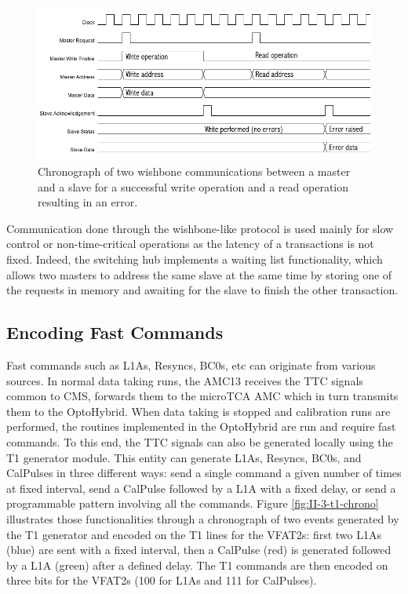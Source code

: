       \begin{figure}[h!]
        \centering
        \includegraphics[width=\textwidth]{img/II-3-test-beam/wishbone-chrono.png}
        \caption{Chronograph of two wishbone communications between a master and a slave for a successful write operation and a read operation resulting in an error.}
        \label{fig:II-3-wishbone-chrono}
      \end{figure}

      Communication done through the wishbone-like protocol is used mainly for slow control or non-time-critical operations as the latency of a transactions is not fixed. Indeed, the switching hub implements a waiting list functionality, which allows two masters to address the same slave at the same time by storing one of the requests in memory and awaiting for the slave to finish the other transaction.

    \subsection{Encoding Fast Commands}

      Fast commands such as L1As, Resyncs, BC0s, etc can originate from various sources. In normal data taking runs, the AMC13 receives the TTC signals common to CMS, forwards them to the microTCA AMC which in turn transmits them to the OptoHybrid. When data taking is stopped and calibration runs are performed, the routines implemented in the OptoHybrid are run and require fast commands. To this end, the TTC signals can also be generated locally using the T1 generator module. This entity can generate L1As, Resyncs, BC0s, and CalPulses in three different ways: send a single command a given number of times at fixed interval, send a CalPulse followed by a L1A with a fixed delay, or send a programmable pattern involving all the commands. Figure \ref{fig:II-3-t1-chrono} illustrates those functionalities through a chronograph of two events generated by the T1 generator and encoded on the T1 lines for the VFAT2s: first two L1As (blue) are sent with a fixed interval, then a CalPulse (red) is generated followed by a L1A (green) after a defined delay. The T1 commands are then encoded on three bits for the VFAT2s (100 for L1As and 111 for CalPulses). \\

